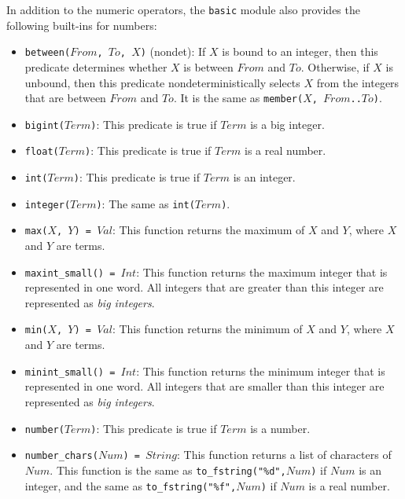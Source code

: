 In addition to the numeric operators, the \texttt{basic} module also provides the following built-ins for numbers:

\begin{itemize}
\item \texttt{between($From$, $To$, $X$)} (nondet): If $X$ is bound to an integer, then this predicate determines whether $X$ is between $From$ and $To$.  Otherwise, if $X$ is unbound, then this predicate nondeterministically selects $X$ from the integers that are between $From$ and $To$. It is the same as \texttt{member($X$, $From$..$To$)}.
\item \texttt{bigint($Term$)}: This predicate is true if $Term$ is a big integer.
\item \texttt{float($Term$)}: This predicate is true if $Term$ is a real number.
\item \texttt{int($Term$)}: This predicate is true if $Term$ is an integer.
\item \texttt{integer($Term$)}: The same as \texttt{int($Term$)}.
\item \texttt{max($X$, $Y$) = $Val$}: This function returns the maximum of $X$ and $Y$, where $X$ and $Y$ are terms.
\item \texttt{maxint\_small() = $Int$}: This function returns the maximum integer that is represented in one word. All integers that are greater than this integer are represented as \textit{big integers}.
\item \texttt{min($X$, $Y$) = $Val$}: This function returns the minimum of $X$ and $Y$, where $X$ and $Y$ are terms.
\item \texttt{minint\_small() = $Int$}: This function returns the minimum integer that is represented in one word. All integers that are smaller than this integer are represented as \textit{big integers}.
\item \texttt{number($Term$)}: This predicate is true if $Term$ is a number.
\item \texttt{number\_chars($Num$) = $String$}: This function returns a list of characters of $Num$. This function is the same as \texttt{to\_fstring("\%d",$Num$)} if $Num$ is an integer, and the same as \texttt{to\_fstring("\%f",$Num$)} if $Num$ is a real number.

\end{itemize}
